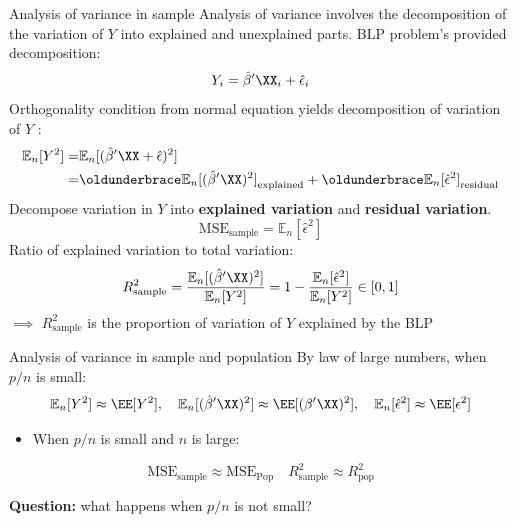 \documentclass[compress, 8pt]{beamer}
\begin{document}
\begin{frame}{Analysis of variance in sample}
    Analysis of variance involves the decomposition of the variation of $Y$ into explained and unexplained parts. BLP problem's provided decomposition:
    \begin{equation*}
        Y_i = \hat{\beta}^\prime \XX_i + \hat{\epsilon}_i
    \end{equation*}
    Orthogonality condition from normal equation yields decomposition of variation of $Y$ :
    \begin{align*}
        \mathbb{E}_n[Y^2] =& \mathbb{E}_n [(\hat{\beta}^\prime \XX + \hat{\epsilon})^2] \\
        =& \underbrace{\mathbb{E}_n [(\hat{\beta}^\prime \XX)^2 ]}_{\text{explained}} + \underbrace{\mathbb{E}_n [\hat{\epsilon}^2]}_{\text{residual}} 
    \end{align*}
    Decompose variation in $Y$ into \textbf{explained variation} and \textbf{residual variation}.
    \begin{equation*}
        \text{MSE}_{\text{sample}} = \mathbb{E}_n [\hat{\epsilon}^2]
    \end{equation*}
    Ratio of explained variation to total variation:
    \begin{equation*}
        R^2_{\text{sample}} = \frac{\mathbb{E}_n[(\hat{\beta}^\prime \XX)^2]}{\mathbb{E}_n[Y^2]} = 1 - \frac{\mathbb{E}_n [\hat{\epsilon}^2]}{\mathbb{E}_n [Y^2]} \in [0, 1]
    \end{equation*}
    $\implies$ $R^2_{\text{sample}}$ is the proportion of variation of $Y$ explained by the BLP
\end{frame}

\begin{frame}{Analysis of variance in sample and population}
    By law of large numbers, when $p/n$ is small:
    \begin{equation*}
        \mathbb{E}_n [Y^2] \approx \EE [Y^2], \quad 
        \mathbb{E}_n[(\hat{\beta}^\prime \XX)^2] \approx \EE[(\beta^\prime \XX)^2], \quad
        \mathbb{E}_n [\hat{\epsilon}^2] \approx \EE [\epsilon^2]
    \end{equation*}

    \begin{itemize}
        \item [$\implies$] When $p/n$ is small and $n$ is large:
    \end{itemize}
    \begin{equation*}
        \text{MSE}_{\text{sample}} \approx \text{MSE}_{\text{Pop}}
        \quad R^2_{\text{sample}} \approx R^2_{\text{pop}} 
    \end{equation*}

    \vspace{2ex} 
    \textbf{Question: } what happens when $p/n$ is not small?
\end{frame}
\end{document}

